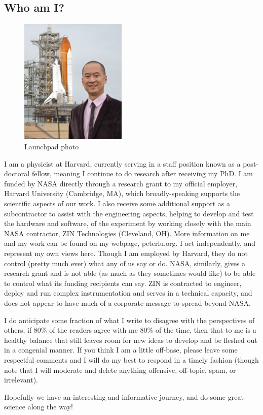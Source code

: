 \subsection{Who am I?}\label{who-am-i}
\begin{figure}
\begin{center}
\includegraphics[width=2in]{./images/peterlu_atlantis_launchpad_sm_110707.png}
\end{center}
\caption{Launchpad photo}
\end{figure}

I am a physicist at Harvard, currently serving in a staff position known as a
post-doctoral fellow, meaning I continue to do research after receiving my PhD.
I am funded by {NASA} directly through a research
grant to my official employer, {Harvard University}
(Cambridge, MA), which broadly-speaking supports the scientific aspects of our
work. I also receive some additional support as a subcontractor to assist with
the engineering aspects, helping to develop and test the hardware and software,
of the experiment by working closely with the main NASA contractor,
{ZIN Technologies} (Cleveland, OH). More
information on me and my work can be found on my webpage,
{peterlu.org}. I act independently, and represent
my own views here. Though I am employed by Harvard, they do not control (pretty
much ever) what any of us say or do. NASA, similarly, gives a research grant and
is not able (as much as they sometimes would like) to be able to control what
its funding recipients can say. ZIN is contracted to engineer, deploy and run
complex instrumentation and serves in a technical capacity, and does not appear
to have much of a corporate message to spread beyond NASA.

I do anticipate some fraction of what I write to disagree with the perspectives
of others; if 80\% of the readers agree with me 80\% of the time, then that to
me is a healthy balance that still leaves room for new ideas to develop and be
fleshed out in a congenial manner. If you think I am a little off-base, please
leave some respectful comments and I will do my best to respond in a timely
fashion (though note that I will moderate and delete anything offensive,
off-topic, spam, or irrelevant).

Hopefully we have an interesting and informative journey, and do some great
science along the way!

